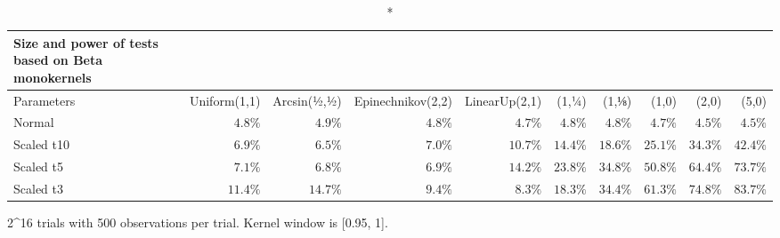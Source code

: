 \setlength{\LTpost}{0mm}
\begin{longtable}{lrrrrrrrrr}
\caption*{
{\large Size and power of tests based on Beta monokernels}
} \\ 
\toprule
Parameters & Uniform(1,1) & Arcsin(½,½) & Epinechnikov(2,2) & LinearUp(2,1) & (1,¼) & (1,⅛) & (1,0) & (2,0) & (5,0) \\ 
\midrule
Normal & $4.8\%$ & $4.9\%$ & $4.8\%$ & $4.7\%$ & $4.8\%$ & $4.8\%$ & $4.7\%$ & $4.5\%$ & $4.5\%$ \\ 
Scaled t10 & $6.9\%$ & $6.5\%$ & $7.0\%$ & $10.7\%$ & $14.4\%$ & $18.6\%$ & $25.1\%$ & $34.3\%$ & $42.4\%$ \\ 
Scaled t5 & $7.1\%$ & $6.8\%$ & $6.9\%$ & $14.2\%$ & $23.8\%$ & $34.8\%$ & $50.8\%$ & $64.4\%$ & $73.7\%$ \\ 
Scaled t3 & $11.4\%$ & $14.7\%$ & $9.4\%$ & $8.3\%$ & $18.3\%$ & $34.4\%$ & $61.3\%$ & $74.8\%$ & $83.7\%$ \\ 
\bottomrule
\end{longtable}
\begin{minipage}{\linewidth}
2\textasciicircum{}16 trials with 500 observations per trial.  Kernel window is [0.95, 1].\\
\end{minipage}


